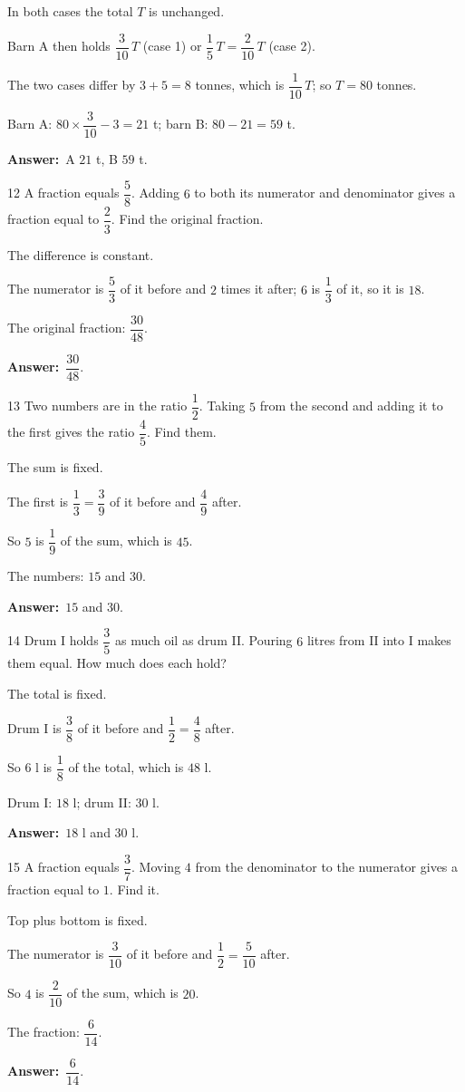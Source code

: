 \documentclass[11pt]{article}
\newif\ifsol \solfalse
\providecommand{\AnsWord}{Đáp số}
\newcommand{\dapso}[1]{\par\textbf{\AnsWord:}\ #1}
\newcommand{\probsol}[1]{%
  \begin{lrbox}{\solmeasure}\begin{minipage}{\dimexpr\linewidth-24pt\relax}#1\end{minipage}\end{lrbox}%
  \ifsol
    \begin{solbox}#1\end{solbox}%
  \else
    \setlength{\solht}{\dimexpr\ht\solmeasure+\dp\solmeasure+0.85cm\relax}%
    \ifdim\solht<1.35cm\setlength{\solht}{1.35cm}\fi
    \begin{tcolorbox}[colback=white,colframe=Line,boxrule=0.8pt,arc=5pt,
      left=8pt,right=8pt,top=4pt,bottom=4pt,height=\solht]{\footnotesize\color{Slate}\itshape\WorkWord}\end{tcolorbox}%
  \fi}
\newcommand{\gap}{\vspace{0.3cm}}
\def\WorkWord{Your work:}
\def\AnsWord{Answer}
\begin{document}
\probsol{
In both cases the total $T$ is unchanged.\par Barn A then holds $\dfrac3{10}\,T$ (case 1) or $\dfrac15\,T=\dfrac2{10}\,T$ (case 2).\par
The two cases differ by $3+5=8$ tonnes, which is $\dfrac1{10}\,T$; so $T=80$ tonnes.\par
Barn A: $80\times\dfrac3{10}-3=21$ t; barn B: $80-21=59$ t.
\dapso{A $21$ t, B $59$ t.}}
\gap
\begin{probbox}{12}{\relax}
A fraction equals $\dfrac58$. Adding $6$ to both its numerator and denominator gives a fraction equal to $\dfrac23$. Find the original fraction.
\end{probbox}
\probsol{
The difference is constant.\par The numerator is $\dfrac53$ of it before and $2$ times it after; $6$ is $\dfrac13$ of it, so it is $18$.\par
The original fraction: $\dfrac{30}{48}$.
\dapso{$\dfrac{30}{48}$.}}
\gap
\begin{probbox}{13}{\relax}
Two numbers are in the ratio $\dfrac12$. Taking $5$ from the second and adding it to the first gives the ratio $\dfrac45$. Find them.
\end{probbox}
\probsol{
The sum is fixed.\par The first is $\dfrac13=\dfrac39$ of it before and $\dfrac49$ after.\par So $5$ is $\dfrac19$ of the sum, which is $45$.\par The numbers: $15$ and $30$.
\dapso{$15$ and $30$.}}
\gap
\begin{probbox}{14}{\relax}
Drum I holds $\dfrac35$ as much oil as drum II. Pouring $6$ litres from II into I makes them equal. How much does each hold?
\end{probbox}
\probsol{
The total is fixed.\par Drum I is $\dfrac38$ of it before and $\dfrac12=\dfrac48$ after.\par So $6$ l is $\dfrac18$ of the total, which is $48$ l.\par Drum I: $18$ l; drum II: $30$ l.
\dapso{$18$ l and $30$ l.}}
\gap
\begin{probbox}{15}{\relax}
A fraction equals $\dfrac37$. Moving $4$ from the denominator to the numerator gives a fraction equal to $1$. Find it.
\end{probbox}
\probsol{
Top plus bottom is fixed.\par The numerator is $\dfrac3{10}$ of it before and $\dfrac12=\dfrac5{10}$ after.\par So $4$ is $\dfrac2{10}$ of the sum, which is $20$.\par The fraction: $\dfrac6{14}$.
\dapso{$\dfrac6{14}$.}}
\end{document}
